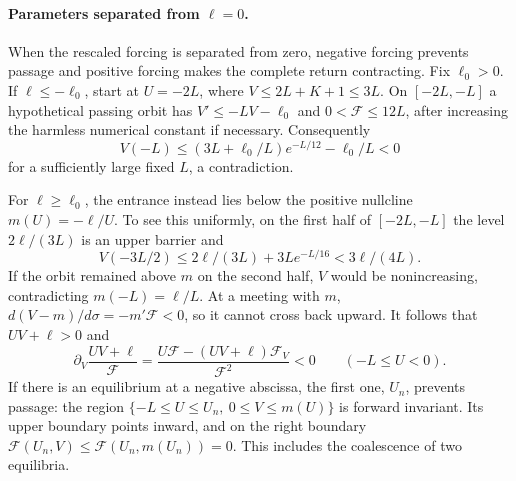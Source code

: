 \paragraph{Parameters separated from $\ell=0$.}
When the rescaled forcing is separated from zero, negative forcing
prevents passage and positive forcing makes the complete return
contracting. Fix $\ell_0>0$. If $\ell\le-\ell_0$, start at $U=-2L$, where
$V\le2L+K+1\le3L$.  On $[-2L,-L]$ a hypothetical passing orbit
has $V'\le-LV-\ell_0$ and $0<\mathcal F\le12L$, after increasing
the harmless numerical constant if necessary.  Consequently
\[
 V(-L)\le(3L+\ell_0/L)e^{-L/12}-\ell_0/L<0
\]
for a sufficiently large fixed $L$, a contradiction.

For $\ell\ge\ell_0$, the entrance instead lies below the positive
nullcline $m(U)=-\ell/U$.  To see this uniformly, on the first half
of $[-2L,-L]$ the level $2\ell/(3L)$ is an upper barrier and
\[
 V(-3L/2)\le2\ell/(3L)+3Le^{-L/16}<3\ell/(4L).
\]
If the orbit remained above $m$ on the second half, $V$ would be
nonincreasing, contradicting $m(-L)=\ell/L$.  At a meeting with $m$,
$d(V-m)/d\sigma=-m'\mathcal F<0$, so it cannot cross back upward.
It follows that $UV+\ell>0$ and
\begin{equation}\label{eq:simple-forcing-negative-density}
 \partial_V\frac{UV+\ell}{\mathcal F}
 =\frac{U\mathcal F-(UV+\ell)\mathcal F_V}{\mathcal F^2}<0
 \qquad(-L\le U<0).
\end{equation}
If there is an equilibrium at a negative abscissa, the first one,
$U_n$, prevents passage: the region
$\{-L\le U\le U_n,\ 0\le V\le m(U)\}$ is forward invariant.
Its upper boundary points inward, and on the right boundary
$\mathcal F(U_n,V)\le\mathcal F(U_n,m(U_n))=0$.
This includes the coalescence of two equilibria.

